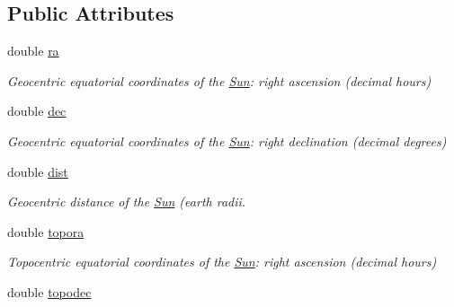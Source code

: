 \subsection*{Public Attributes}
\begin{DoxyCompactItemize}
\item 
\hypertarget{class_sun_a0edd085c46f080d5ee0d74b6d02c6882}{double \hyperlink{class_sun_a0edd085c46f080d5ee0d74b6d02c6882}{ra}}\label{class_sun_a0edd085c46f080d5ee0d74b6d02c6882}

\begin{DoxyCompactList}\small\item\em Geocentric equatorial coordinates of the \hyperlink{class_sun}{Sun}\-: right ascension (decimal hours) \end{DoxyCompactList}\item 
\hypertarget{class_sun_a0b28686e74b71ce04babcca5c366b2f8}{double \hyperlink{class_sun_a0b28686e74b71ce04babcca5c366b2f8}{dec}}\label{class_sun_a0b28686e74b71ce04babcca5c366b2f8}

\begin{DoxyCompactList}\small\item\em Geocentric equatorial coordinates of the \hyperlink{class_sun}{Sun}\-: right declination (decimal degrees) \end{DoxyCompactList}\item 
\hypertarget{class_sun_a0a3680a99a1434eac81dab077b2ccf61}{double \hyperlink{class_sun_a0a3680a99a1434eac81dab077b2ccf61}{dist}}\label{class_sun_a0a3680a99a1434eac81dab077b2ccf61}

\begin{DoxyCompactList}\small\item\em Geocentric distance of the \hyperlink{class_sun}{Sun} (earth radii. \end{DoxyCompactList}\item 
\hypertarget{class_sun_ad5481da59fd93209ffabd2ed68d7562b}{double \hyperlink{class_sun_ad5481da59fd93209ffabd2ed68d7562b}{topora}}\label{class_sun_ad5481da59fd93209ffabd2ed68d7562b}

\begin{DoxyCompactList}\small\item\em Topocentric equatorial coordinates of the \hyperlink{class_sun}{Sun}\-: right ascension (decimal hours) \end{DoxyCompactList}\item 
\hypertarget{class_sun_a6d9237d4bd53837a42de69caa11c4cfd}{double \hyperlink{class_sun_a6d9237d4bd53837a42de69caa11c4cfd}{topodec}}\label{class_sun_a6d9237d4bd53837a42de69caa11c4cfd}


\end{DoxyCompactItemize}
